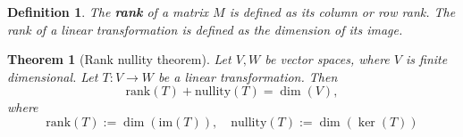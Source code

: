 \documentclass[12pt]{article}
\newcommand{\im}[0]{\text{im}}
\newtheorem{thm}{Theorem}[section]
\newtheorem{defn}{Definition}[thm]
\begin{document}
\begin{defn}
  The \textbf{rank} of a matrix $M$ is defined as its column or row rank. The rank of a linear transformation is defined as the dimension of its image.
\end{defn}

\begin{thm}[Rank nullity theorem]
  Let $V, W$ be vector spaces, where $V$ is finite dimensional. Let $T :V \to W$ be a linear transformation. Then
  \begin{equation*}
    \text{rank}(T) + \text{nullity}(T) = \dim(V),
  \end{equation*}
  where
  \begin{equation*}
    \text{rank}(T) := \dim(\im(T)), \quad \text{nullity}(T) := \dim(\ker(T))
  \end{equation*}
\end{thm}
\end{document}
